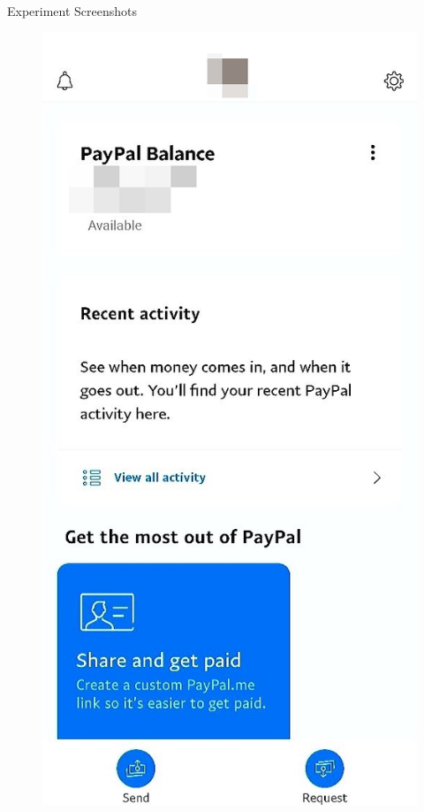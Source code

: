 \documentclass{beamer}
\begin{document}
\begin{frame}{Experiment Screenshots}
	\begin{figure}[htbp]
		\centering
		\begin{minipage}[t]{0.3\textwidth}
			\centering
			\includegraphics[width=\textwidth]{Figs/paypal.png}

\end{minipage}
\end{figure}
\end{frame}
\end{document}
